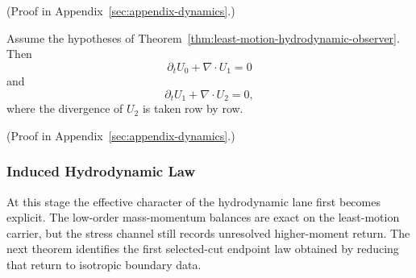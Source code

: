 (Proof in Appendix~\ref{sec:appendix-dynamics}.)

\begin{corollary}
\label{cor:hydrodynamic-moment-balance}
Assume the hypotheses of
Theorem~\ref{thm:least-motion-hydrodynamic-observer}. Then
\[
\partial_t U_0 + \nabla\!\cdot U_1 = 0
\]
and
\[
\partial_t U_1 + \nabla\!\cdot U_2 = 0,
\]
where the divergence of \(U_2\) is taken row by row.
\end{corollary}

(Proof in Appendix~\ref{sec:appendix-dynamics}.)

\subsubsection{Induced Hydrodynamic Law}

At this stage the effective character of the hydrodynamic lane first becomes
explicit. The low-order mass-momentum balances are exact on the least-motion
carrier, but the stress channel still records unresolved higher-moment return.
The next theorem identifies the first selected-cut endpoint law obtained by
reducing that return to isotropic boundary data.

